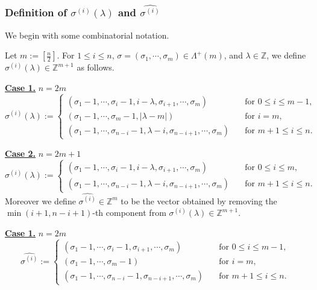 \subsubsection{Definition of $\sigma^{(i)}(\lambda)$
 and $\widehat{\sigma^{(i)}}$}
We begin with some combinatorial notation.  
\begin{definition}
\label{def:sigmailmd}
Let $m:=[\frac n 2]$.  
For $1 \le i \le n$, 
 $\sigma=(\sigma_1, \cdots,\sigma_m) \in \Lambda^+(m)$, 
 and $\lambda \in {\mathbb{Z}}$, 
 we define $\sigma^{(i)}(\lambda) \in {\mathbb{Z}}^{m+1}$
 as follows.  
\par\noindent
{\bf{\underline{Case 1.}}}\enspace
$n=2m$
\begin{equation*}
\sigma^{(i)}(\lambda):=
\begin{cases}
(\sigma_{1}-1,\cdots,\sigma_{i}-1,i-\lambda,\sigma_{i+1},\cdots,\sigma_{m})
\quad
&\text{for $0 \le i \le m-1$,}
\\
(\sigma_{1}-1,\cdots,\sigma_{m}-1,|\lambda-m|)
\quad
&\text{for $i=m$,}
\\
(\sigma_{1}-1,\cdots,\sigma_{n-i}-1,\lambda-i,\sigma_{n-i+1},\cdots,\sigma_{m})
\quad
&\text{for $m+1 \le i \le n$.  }
\end{cases}
\end{equation*}

\par\noindent
{\bf{\underline{Case 2.}}}\enspace
$n=2m+1$
\begin{equation*}
\sigma^{(i)}(\lambda):=
\begin{cases}
(\sigma_{1}-1,\cdots,\sigma_{i}-1,i-\lambda,\sigma_{i+1},\cdots,\sigma_{m})
\quad
&\text{for $0 \le i \le m$,}
\\
(\sigma_{1}-1,\cdots,\sigma_{n-i}-1,\lambda-i,\sigma_{n-i+1}, \cdots,\sigma_m)
\quad
&\text{for $m+1 \le i \le n$.  }
\end{cases}
\end{equation*}
Moreover we define $\widehat{\sigma^{(i)}} \in {\mathbb{Z}}^m$
 to be the vector obtained by removing the 
 $\min(i+1, n-i+1)$-th component from $\sigma^{(i)}(\lambda)\in {\mathbb{Z}}^{m+1}$.  
\end{definition}

\par\noindent
{\bf{\underline{Case 1.}}}\enspace
$n=2m$
\begin{equation*}
\widehat{\sigma^{(i)}}:=
\begin{cases}
(\sigma_{1}-1,\cdots,\sigma_{i}-1,\sigma_{i+1},\cdots,\sigma_{m})
\quad
&\text{for $0 \le i \le m-1$,}
\\
(\sigma_{1}-1,\cdots,\sigma_{m}-1)
\quad
&\text{for $i=m$,}
\\
(\sigma_{1}-1,\cdots,\sigma_{n-i}-1,\sigma_{n-i+1},\cdots,\sigma_{m})
\quad
&\text{for $m+1 \le i \le n$.  }
\end{cases}
\end{equation*}

